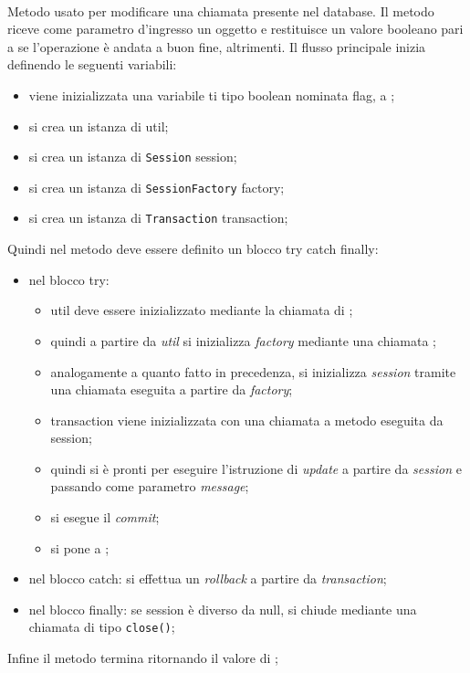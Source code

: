 \begin{description}
	\item{}\\
	Metodo usato per modificare una chiamata presente nel database. Il metodo riceve come parametro d'ingresso un oggetto  e restituisce un valore booleano  pari a  se l'operazione è andata a buon fine,  altrimenti. Il flusso principale inizia definendo le seguenti variabili:
	\begin{itemize}
		\item viene inizializzata una variabile ti tipo boolean nominata flag, a ;
		\item si crea un istanza di  util;
		\item si crea un istanza di \texttt{Session} session;
		\item si crea un istanza di \texttt{SessionFactory} factory;
		\item si crea un istanza di \texttt{Transaction} transaction;
	\end{itemize}
	Quindi nel metodo deve essere definito un blocco try catch finally:
	\begin{itemize}
		\item nel blocco try:
		\begin{itemize}
			\item util deve essere inizializzato mediante la chiamata  di ;
			\item quindi a partire da \textit{util} si inizializza \textit{factory} mediante una chiamata ;
			\item analogamente a quanto fatto in precedenza, si inizializza \textit{session} tramite una chiamata  eseguita a partire da \textit{factory};
			\item transaction viene inizializzata con una chiamata a metodo  eseguita da session;
			\item quindi si è pronti per eseguire l'istruzione di \textit{update} a partire da \textit{session} e passando come parametro \textit{message};
			\item si esegue il \textit{commit};
			\item si pone  a ;
		\end{itemize}
		\item nel blocco catch: si effettua un \textit{rollback} a partire da \textit{transaction};
		\item nel blocco finally: se session è diverso da null, si chiude mediante una chiamata di tipo \texttt{close()};
	\end{itemize}
	Infine il metodo termina ritornando il valore di ;	
	

\end{description}
